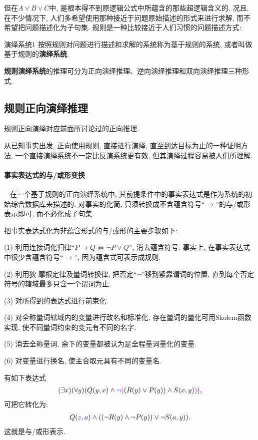 但在$A\vee B\vee C$中, 是根本得不到原逻辑公式中所蕴含的那些超逻辑含义的. 况且, 在不少情况下, 人们多希望使用那种接近于问题原始描述的形式来进行求解, 而不希望把问题描述化为子句集.
规则是一种比较接近于人们习惯的问题描述方式:
\begin{mydef}{演绎系统}{1}
    按照规则对问题进行描述和求解的系统称为基于规则的系统, 或者叫做基于规则的\textbf{演绎系统}.
\end{mydef}

\begin{remark}
    \textbf{规则演绎系统}的推理可分为正向演绎推理、逆向演绎推理和双向演绎推理三种形式.
\end{remark}
\subsection{规则正向演绎推理}
规则正向演绎对应前面所讨论过的正向推理.

从已知事实出发, 正向使用规则, 直接进行演绎, 直至到达目标为止的一种证明方法. 一个直接演绎系统不一定比反演系统更有效, 但其演绎过程容易被人们所理解.
\paragraph{事实表达式的与/或形变换}~{}
    在一个基于规则的正向演绎系统中, 其前提条件中的事实表达式是作为系统的初始综合数据库来描述的. 对事实的化简, 只须转换成不含蕴含符号“$\rightarrow$”的与/或形表示即可, 而不必化成子句集.

把事实表达式化为非蕴含形式的与/或形的主要步骤如下:

(1) 利用连接词化归律“$P\rightarrow Q\Leftrightarrow \neg P\vee Q$”, 消去蕴含符号. 事实上, 在事实表达式中很少含蕴含符号“$\rightarrow$”, 因为蕴含式可表示成规则.

(2) 利用狄$\cdot$摩根定律及量词转换律, 把否定“$\neg$”移到紧靠谓词的位置, 直到每个否定符号的辖域最多只含一个谓词为止.

(3) 对所得到的表达式进行前束化.

(4) 对全称量词辖域内的变量进行改名和标准化, 存在量词的量化可用Skolem函数实现, 使不同量词约束的变元有不同的名字.

(5) 消去全称量词, 余下的变量都被认为是全程量词量化的变量.

(6) 对变量进行换名, 使主合取元具有不同的变量名.
\begin{example}
有如下表达式
\begin{align}
    (\exists  x) (\forall y)(Q(y, x)\wedge \textcolor[rgb]{0.00,0.00,1.00}{\neg} \textcolor[rgb]{1.00,0.00,1.00}{(}(R(y)\vee P(y))\wedge S(x, y)\textcolor[rgb]{1.00,0.00,1.00}{)}),
\end{align}
可把它转化为:
\begin{align}
    Q(\textcolor[rgb]{0.00,0.00,1.00}{z, a})\wedge ((\neg R(y)\wedge \neg P(y))\vee \neg S(a, y)).
\end{align}
这就是与/或形表示.
\end{example}
